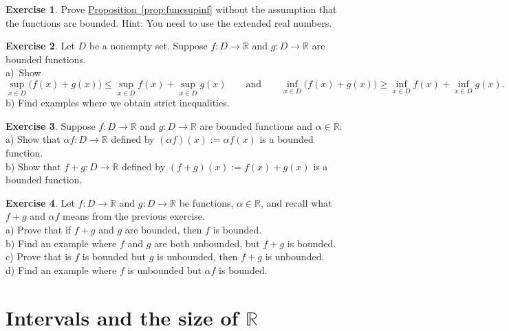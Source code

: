 \documentclass[12pt]{book}
\newcommand{\R}{{\mathbb{R}}}
\newcommand{\sectionnewpage}{\clearpage}
\theoremstyle{plain}
\theoremstyle{remark}
\theoremstyle{definition}
\theoremstyle{exercise}
\newtheorem{exercise}{Exercise}[section]
\theoremstyle{example}
\newcommand{\propref}[1]{\hyperref[#1]{Proposition~\ref*{#1}}}
\begin{document}
\begin{exercise}
Prove \propref{prop:funcsupinf} without the assumption that
the functions are bounded.  Hint: You need to use the extended real
numbers.
\end{exercise}

\begin{exercise} \label{exercise:sumofsup}
Let $D$ be a nonempty set.
Suppose $f \colon D \to \R$ and $g \colon D \to \R$ are bounded functions.
\\
a)~Show 
\begin{equation*}
\sup_{x\in D} \bigl(f(x) + g(x) \bigr) \leq
\sup_{x\in D} f(x)
+
\sup_{x\in D} g(x)
\qquad \text{and} \qquad
\inf_{x\in D} \bigl(f(x) + g(x) \bigr) \geq
\inf_{x\in D} f(x)
+
\inf_{x\in D} g(x) .
\end{equation*}
b) Find examples where we obtain strict inequalities.
\end{exercise}

\begin{exercise}
Suppose $f \colon D \to \R$ and $g \colon D \to \R$ are bounded functions
and
$\alpha \in \R$.\\
a) Show that $\alpha f \colon D \to \R$ defined by $(\alpha f) (x) := \alpha
f(x)$ is a bounded function.\\
b) Show that $f+g \colon D \to \R$ defined by $(f+g) (x) := f(x) + g(x)$
is a bounded function.
\end{exercise}

\begin{exercise}
Let $f \colon D \to \R$ and $g \colon D \to \R$ be functions, $\alpha \in
\R$, and
recall what $f+g$ and $\alpha f$ means from the previous exercise.
\\
a) Prove that if $f+g$ and $g$ are bounded, then $f$ is bounded.
\\
b) Find an example where $f$ and $g$ are both unbounded, but $f+g$ is
bounded.
\\
c) Prove that is $f$ is bounded but $g$ is unbounded, then $f+g$ is
unbounded.
\\
d) Find an example where $f$ is unbounded but $\alpha f$ is bounded.
\end{exercise}


\sectionnewpage
\section{Intervals and the size of \texorpdfstring{$\R$}{R}}
\label{sec:intandsizeR}
\end{document}
